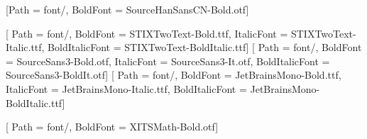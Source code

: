 [Path = font/, BoldFont = SourceHanSansCN-Bold.otf]
\renewcommand{\coverfont}{\CJKfamily{cncover}}   %

\setmainfont{STIXTwoText-Regular.ttf}[
    Path = font/,
    BoldFont = STIXTwoText-Bold.ttf,
    ItalicFont = STIXTwoText-Italic.ttf,
    BoldItalicFont = STIXTwoText-BoldItalic.ttf]
\setsansfont{SourceSans3-Regular.otf}[
    Path = font/,
    BoldFont = SourceSans3-Bold.otf,
    ItalicFont = SourceSans3-It.otf,
    BoldItalicFont = SourceSans3-BoldIt.otf]
\setmonofont{JetBrainsMono-Regular.ttf}[
    Path = font/,
    BoldFont = JetBrainsMono-Bold.ttf,
    ItalicFont = JetBrainsMono-Italic.ttf,
    BoldItalicFont = JetBrainsMono-BoldItalic.ttf]

\RequirePackage{unicode-math}                   %
[
    Path = font/, BoldFont = XITSMath-Bold.otf]
\renewcommand{\qedsymbol}{\ensuremath{\mdlgwhtsquare}}



\usepackage{subcaption}  %

\usepackage{tikz}
\usetikzlibrary{positioning,arrows.meta,shapes.geometric,calc}

